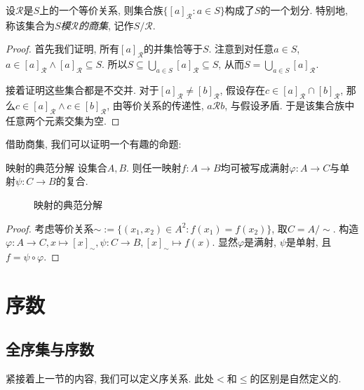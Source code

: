 \begin{proposition}{}
	设$\mathcal{R}$是$S$上的一个等价关系, 则集合族$\{ [a]_{\mathcal{R}}: a \in S \}$构成了$S$的一个划分. 特别地, 称该集合为\textit{$S$模$\mathcal{R}$的商集}, 记作$S / \mathcal{R}$. 
\end{proposition}
\begin{proof}
	首先我们证明, 所有$[a]_{\mathcal{R}}$的并集恰等于$S$. 注意到对任意$a \in S$, $a \in [a]_{\mathcal{R}} \wedge [a]_{\mathcal{R}} \subseteq S$. 所以$S \subseteq \bigcup_{a \in S} [a]_{\mathcal{R}} \subseteq S$, 从而$S = \bigcup_{a \in S} [a]_{\mathcal{R}}$. 
	
	接着证明这些集合都是不交并. 对于$[a]_{\mathcal{R}} \neq [b]_{\mathcal{R}}$, 假设存在$c \in [a]_{\mathcal{R}} \cap [b]_{\mathcal{R}}$, 那么$c \in [a]_{\mathcal{R}} \wedge c \in [b]_{\mathcal{R}}$, 由等价关系的传递性, $a\mathcal{R}b$, 与假设矛盾. 于是该集合族中任意两个元素交集为空.
\end{proof}

借助商集, 我们可以证明一个有趣的命题: 

\begin{proposition}{映射的典范分解}
	设集合$A,B$. 则任一映射$f:A \to B$均可被写成满射$\varphi :A \to C$与单射$\psi :C \to B$的复合. 
\end{proposition}

\begin{figure}[h!]
	\centering
{}
	\caption{映射的典范分解}
\end{figure}

\begin{proof}
	考虑等价关系$\sim := \{ (x_1,x_2) \in A^2:f(x_1)=f(x_2) \}$, 取$C = A / \sim$. 构造$\varphi :A \to C,x \mapsto [x]_{\sim}, \psi : C \to B,[x]_{\sim} \mapsto f(x)$. 显然$\varphi$是满射, $\psi$是单射, 且$f=\psi \circ \varphi$. 
\end{proof}

\section{序数}

\subsection{全序集与序数}

紧接着上一节的内容, 我们可以定义序关系. 此处$<$和$\leq$的区别是自然定义的. 


